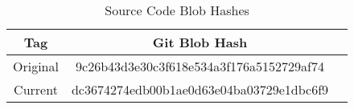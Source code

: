 \begin{longtable}{|c|c|c|}
    \caption{Source Code Blob Hashes}
    \label{tab:sourceCodeBlobHashes}

    \\ \hline

    \rowcolor{McMasterMediumGrey}
    \textbf{Tag} & \textbf{Git Blob Hash}                   
    \\ \hline

    Original     & 9c26b43d3e30c3f618e534a3f176a5152729af74 
    \\ \hline

    Current      & dc3674274edb00b1ae0d63e04ba03729e1dbc6f9 
    \\ \hline
\end{longtable}

